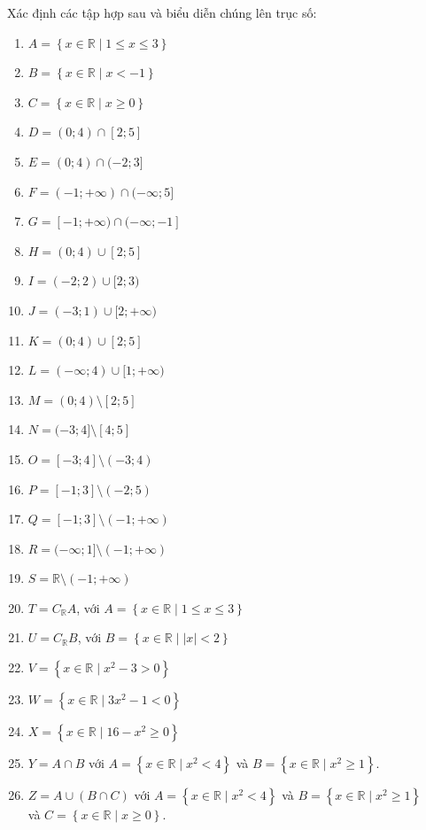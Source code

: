 \begin{vd}
Xác định các tập hợp sau và biểu diễn chúng lên trục số:
\begin{enumerate}
	\item $A=\left\{x \in \mathbb{R} \mid 1 \le x \le 3\right\}$\dotfill
	\item $B=\left\{x \in \mathbb{R} \mid x < -1\right\}$\dotfill 
	\item $C=\left\{x \in \mathbb{R} \mid x \ge 0 \right\}$\dotfill 
	\item $D=(0;4) \cap [2;5]$\dotfill
	\item $E=(0;4) \cap (-2;3]$\dotfill
	\item $F=(-1;+\infty) \cap (-\infty;5]$\dotfill
	\item $G=[-1;+\infty) \cap (-\infty;-1]$\dotfill
	\item $H=(0;4) \cup [2;5]$\dotfill
	\item $I=(-2;2) \cup [2;3)$\dotfill
	\item $J=(-3;1) \cup [2;+\infty)$\dotfill
	\item $K=(0;4) \cup [2;5]$\dotfill
	\item $L=(-\infty;4) \cup [1;+\infty)$\dotfill
	\item $M=(0;4) \setminus [2;5]$\dotfill
	\item $N=(-3;4] \setminus [4;5]$\dotfill
	\item $O=[-3;4] \setminus (-3;4)$\dotfill
	\item $P=[-1;3] \setminus (-2;5)$\dotfill
	\item $Q=[-1;3] \setminus (-1;+\infty)$\dotfill
	\item $R=(-\infty;1] \setminus (-1;+\infty)$\dotfill
	\item $S=\mathbb{R} \setminus (-1;+\infty)$\dotfill
	\item $T=C_{\mathbb{R}} A$, với $A=\left\{x \in \mathbb{R} \mid 1 \le x \le 3\right\}$\dotfill
	\item $U=C_{\mathbb{R}} B$, với $B=\left\{x \in \mathbb{R} \mid |x| < 2\right\}$\dotfill
	\item $V=\left\{x \in \mathbb{R} \mid x^2-3>0\right\}$\dotfill
	\item $W=\left\{x \in \mathbb{R} \mid 3x^2-1<0\right\}$\dotfill
	\item $X=\left\{x \in \mathbb{R} \mid 16-x^2 \ge 0 \right\}$\dotfill
	\item $Y=A \cap B$ với $A=\left\{x \in \mathbb{R} \mid x^2<4\right\}$ và $B=\left\{x \in \mathbb{R} \mid x^2 \ge 1\right\}$.
	\item $Z=A \cup (B \cap C)$ với $A=\left\{x \in \mathbb{R} \mid x^2<4\right\}$ và $B=\left\{x \in \mathbb{R} \mid x^2 \ge 1\right\}$ \\và $C=\left\{x \in \mathbb{R} \mid x \ge 0 \right\}$.
\end{enumerate}
	

\end{vd}
